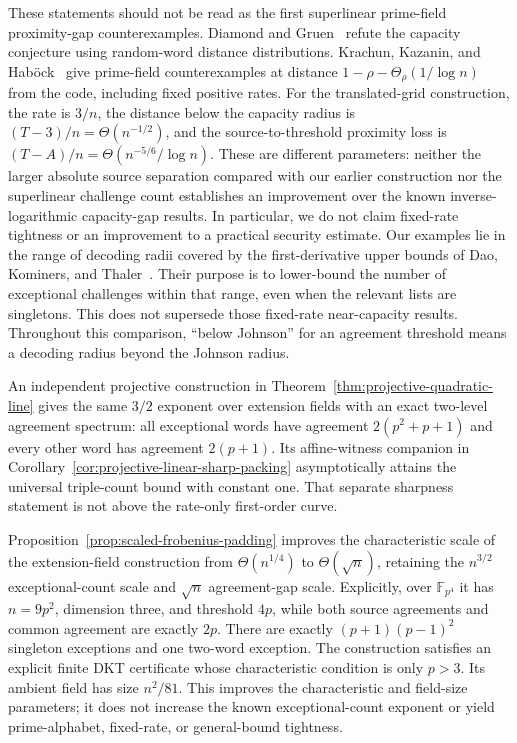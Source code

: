 \documentclass[11pt,letterpaper]{article}
\theoremstyle{definition}
\theoremstyle{remark}
\newcommand{\F}{\mathbb F}
\begin{document}
These statements should not be read as the first superlinear prime-field
proximity-gap counterexamples. Diamond and Gruen~\cite{diamond-gruen-random}
refute the capacity conjecture using random-word distance distributions.
Krachun, Kazanin, and Hab\"ock~\cite{kkh}
give prime-field counterexamples at distance
$1-\rho-\Theta_\rho(1/\log n)$ from the code, including fixed positive
rates. For the translated-grid construction, the rate is $3/n$,
the distance below the capacity radius is
$(T-3)/n=\Theta(n^{-1/2})$, and the source-to-threshold
proximity loss is $(T-A)/n=\Theta(n^{-5/6}/\log n)$.
These are different parameters: neither the larger absolute source
separation compared with our earlier construction nor the superlinear
challenge count establishes an improvement over the known
inverse-logarithmic capacity-gap results. In particular, we do not claim
fixed-rate tightness or an improvement to a practical security estimate.
Our examples lie in the range of decoding radii covered by the
first-derivative upper bounds of Dao, Kominers, and Thaler~\cite{dkt2026}.
Their purpose is to lower-bound the number of exceptional challenges
within that range, even when the relevant lists are singletons.
This does not supersede those fixed-rate near-capacity
results. Throughout this comparison, ``below Johnson'' for an agreement
threshold means a decoding radius beyond the Johnson radius.

An independent projective construction in
Theorem~\ref{thm:projective-quadratic-line} gives the same $3/2$
exponent over extension fields with an exact two-level agreement spectrum:
all exceptional words have agreement $2(p^2+p+1)$ and every other word
has agreement $2(p+1)$. Its affine-witness companion in
Corollary~\ref{cor:projective-linear-sharp-packing} asymptotically
attains the universal triple-count bound with constant one. That separate
sharpness statement is not above the rate-only first-order curve.

Proposition~\ref{prop:scaled-frobenius-padding} improves the characteristic
scale of the extension-field construction from $\Theta(n^{1/4})$ to
$\Theta(\sqrt n)$, retaining the $n^{3/2}$ exceptional-count scale and
$\sqrt n$ agreement-gap scale. Explicitly, over $\F_{p^4}$ it has
$n=9p^2$, dimension three, and threshold $4p$, while both source
agreements and common agreement are exactly $2p$. There are exactly
$(p+1)(p-1)^2$ singleton exceptions and one two-word exception.
The construction satisfies an explicit finite DKT certificate whose
characteristic condition is only $p>3$. Its ambient field has size
$n^2/81$. This improves the characteristic and field-size parameters;
it does not increase the known exceptional-count exponent or yield
prime-alphabet, fixed-rate, or general-bound tightness.
\end{document}
